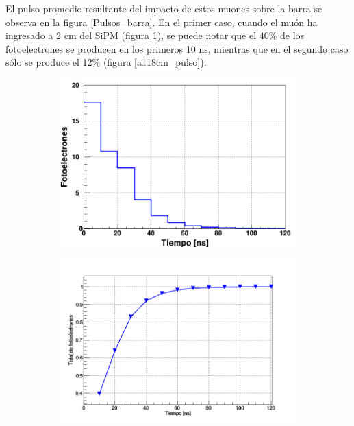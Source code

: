 \documentclass[12pt,oneside,openany,letter]{book}
\begin{document}
El pulso promedio resultante del impacto de estos muones sobre la barra se observa en la figura \ref{Pulsos_barra}. En el primer caso, cuando el mu\'on ha ingresado a 2 cm del SiPM (figura \ref{a2cm_pulso}), se puede notar que el 40\% de los fotoelectrones se producen en los primeros 10 ns, mientras que en el segundo caso s\'olo se produce el 12\% (figura \ref{a118cm_pulso}).  
\begin{figure}[h!]
    \centering
    \begin{subfigure}{0.44\textwidth}
        \includegraphics[width=\textwidth]{images/a2cm_pulso.png}
        \caption{}
        \label{a2cm_pulso}
    \end{subfigure}
    \begin{subfigure}{0.5\textwidth}
        \includegraphics[width=\textwidth]{images/2cmcum.png}
        \caption{}

\end{subfigure}
\end{figure}
\end{document}
